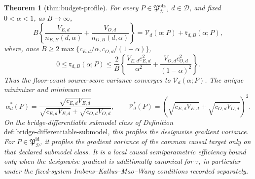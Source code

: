 \documentclass{article}
\newtheorem{theorem}{Theorem}
\begin{document}
\begin{theorem}[thm:budget-profile]\label{thm:budget-profile}
For every \(P\in\mathfrak P_{\mathcal D}^{\mathrm{obs}}\), \(d\in\mathcal D\), and fixed \(0<\alpha<1\), as \(B\to\infty\),
\[
B\left\{\frac{V_{E,d}}{n_{E,B}(d,\alpha)}+\frac{V_{O,d}}{n_{O,B}(d,\alpha)}\right\}
=\mathcal V_d(\alpha;P)+\mathfrak r_{d,B}(\alpha;P),
\]
where, once \(B\ge2\max\{c_{E,d}/\alpha,c_{O,d}/(1-\alpha)\}\),
\[
0\le\mathfrak r_{d,B}(\alpha;P)\le \frac2B\left\{
\frac{V_{E,d}c_{E,d}^2}{\alpha^2}+
\frac{V_{O,d}c_{O,d}^2}{(1-\alpha)^2}\right\}.
\]
Thus the floor-count source-score variance converges to \(\mathcal V_d(\alpha;P)\). The unique minimizer and minimum are
\[
\alpha_d^*(P)=\frac{\sqrt{c_{E,d}V_{E,d}}}{\sqrt{c_{E,d}V_{E,d}}+\sqrt{c_{O,d}V_{O,d}}},
\qquad
\mathcal V_d^*(P)=\left(\sqrt{c_{E,d}V_{E,d}}+\sqrt{c_{O,d}V_{O,d}}\right)^2.
\]
On the bridge-differentiable submodel class of Definition~\(\mathrm{def{:}bridge\text{-}differentiable\text{-}submodel}\), this profiles the designwise gradient variance. For \(P\in\mathfrak P_{\mathcal D}^{\mathrm{id}}\), it profiles the gradient variance of the common causal target only on that declared submodel class. It is a local causal semiparametric efficiency bound only when the designwise gradient is additionally canonical for \(\tau\), in particular under the fixed-system Imbens--Kallus--Mao--Wang conditions recorded separately.
\end{theorem}
\end{document}
